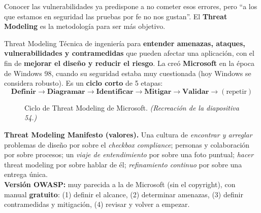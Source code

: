 \documentclass[11pt,a4paper]{article}
\begin{document}
Conocer las vulnerabilidades ya predispone a no cometer esos errores, pero ``a los que estamos
en seguridad las pruebas por fe no nos gustan''. El \textbf{Threat Modeling} es la metodología
para ser más objetivo.

\begin{defbox}{Threat Modeling}
Técnica de ingeniería para \textbf{entender amenazas, ataques, vulnerabilidades y contramedidas}
que pueden afectar una aplicación, con el fin de \textbf{mejorar el diseño y reducir el riesgo}.
La creó \textbf{Microsoft} en la época de Windows 98, cuando su seguridad estaba muy cuestionada
(hoy Windows se considera robusto). Es un \textbf{ciclo corto} de 5 etapas:
\[
\textbf{Definir} \to \textbf{Diagramar} \to \textbf{Identificar} \to \textbf{Mitigar} \to
\textbf{Validar} \to (\text{repetir})
\]
\end{defbox}

\begin{figure}[h]
\centering
{}
\caption{Ciclo de Threat Modeling de Microsoft. \textit{(Recreación de la diapositiva 54.)}}
\end{figure}

\begin{slidebox}
\textbf{Threat Modeling Manifesto (valores).} Una cultura de \emph{encontrar y arreglar}
problemas de diseño por sobre el \emph{checkbox compliance}; personas y colaboración por sobre
procesos; un \emph{viaje de entendimiento} por sobre una foto puntual; \emph{hacer} threat
modeling por sobre hablar de él; \emph{refinamiento continuo} por sobre una entrega única.\\[3pt]
\textbf{Versión OWASP:} muy parecida a la de Microsoft (sin el copyright), con manual
\textbf{gratuito}: (1) definir el alcance, (2) determinar amenazas, (3) definir contramedidas y
mitigación, (4) revisar y volver a empezar.
\end{slidebox}
\end{document}
